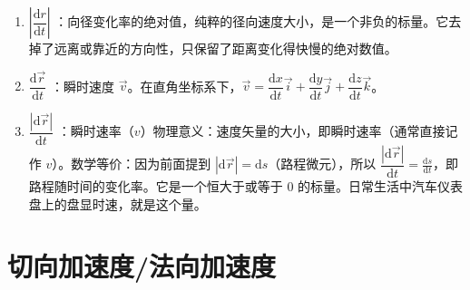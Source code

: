 \documentclass[lang=cn,11pt]{elegantbook}
\begin{document}
\begin{definition}[位置矢量]
\begin{enumerate}
\begin{itemize}
\item $\dfrac{\mathrm{d}r}{\mathrm{d}t} < 0$ 表示质点正在靠近原点；
\item $\dfrac{\mathrm{d}r}{\mathrm{d}t} = 0$ 表示质点到原点的距离在这一瞬间没有改变（例如匀速圆周运动，因 $r=R$ 恒定，故该项恒为 $0$）。
\end{itemize}
\item $\left|\dfrac{\mathrm{d}r}{\mathrm{d}t}\right|$ ：向径变化率的绝对值，纯粹的径向速度大小，是一个非负的标量。它去掉了远离或靠近的方向性，只保留了距离变化得快慢的绝对数值。
\item $\dfrac{\mathrm{d}\vec{r}}{\mathrm{d}t}$ ：瞬时速度 $\vec{v}$。在直角坐标系下，$\vec{v} = \dfrac{\mathrm{d}x}{\mathrm{d}t}\vec{i} + \dfrac{\mathrm{d}y}{\mathrm{d}t}\vec{j} + \dfrac{\mathrm{d}z}{\mathrm{d}t}\vec{k}$。
\item $\dfrac{|\mathrm{d}\vec{r}|}{\mathrm{d}t}$ ：瞬时速率（$v$）物理意义：速度矢量的大小，即瞬时速率（通常直接记作 $v$）。数学等价：因为前面提到 $|\mathrm{d}\vec{r}| = \mathrm{d}s$（路程微元），所以 $\dfrac{|\mathrm{d}\vec{r}|}{\mathrm{d}t} = \frac{\mathrm{d}s}{\mathrm{d}t}$，即路程随时间的变化率。它是一个恒大于或等于 0 的标量。日常生活中汽车仪表盘上的盘显时速，就是这个量。
\end{enumerate}
\end{definition}

\section{切向加速度/法向加速度}
\end{document}
